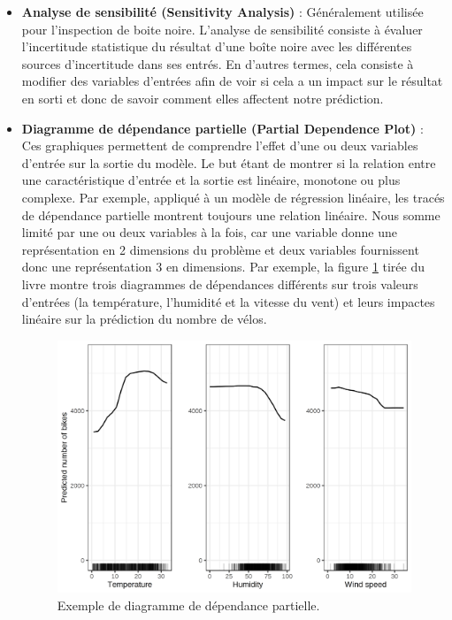 \begin{itemize}
    \item \textbf{Analyse de sensibilité (Sensitivity Analysis)} : Généralement utilisée pour l'inspection de boite noire. L'analyse de sensibilité consiste à évaluer l’incertitude statistique du résultat d’une boîte noire avec les différentes sources d’incertitude dans ses entrés. En d'autres termes, cela consiste à modifier des variables d'entrées afin de voir si cela a un impact sur le résultat en sorti et donc de savoir comment elles affectent notre prédiction.
    
    \item \textbf{Diagramme de dépendance partielle (Partial Dependence Plot)} : Ces graphiques permettent de comprendre l'effet d'une ou deux variables d'entrée sur la sortie du modèle. Le but étant de  montrer si la relation entre une caractéristique d'entrée et la sortie est linéaire, monotone ou plus complexe. Par exemple, appliqué à un modèle de régression linéaire, les tracés de dépendance partielle montrent toujours une relation linéaire. Nous somme limité par une ou deux variables à la fois, car une variable donne une représentation en 2 dimensions du problème et deux variables fournissent donc une représentation 3 en dimensions. Par exemple, la figure \ref{partialDependencePlot} tirée du livre \cite{molnar2019} montre trois diagrammes de dépendances différents sur trois valeurs d'entrées (la température, l'humidité et la vitesse du vent) et leurs impactes linéaire sur la prédiction du nombre de vélos.
    \begin{figure}[h]
        \includegraphics[scale=0.17]{src_img/partialDependencePlot.png}
        \caption{Exemple de diagramme de dépendance partielle.}
        \label{partialDependencePlot}
    \end{figure}
    

\end{itemize}
